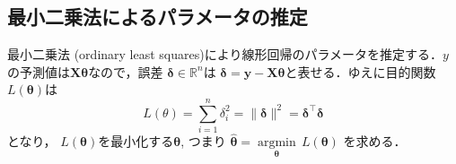 \subsection{最小二乗法によるパラメータの推定}最小二乗法 (ordinary least squares)により線形回帰のパラメータを推定する．$y$の予測値は$\mathbf{X} \mathbf{\theta}$なので，誤差 $\mathbf{\delta} \in \mathbb{R}^n$は
$\mathbf{\delta} = \mathbf{y}-\mathbf{X} \mathbf{\theta}$と表せる．ゆえに目的関数$L(\mathbf{\theta})$は 
$$
L(\theta)=\sum_{i=1}^n \delta_i^2 = \|\mathbf{\delta}\|^2=\mathbf{\delta}^\top \mathbf{\delta}
$$
となり， $L(\mathbf{\theta})$を最小化する$\mathbf{\theta}$, つまり $\hat {\mathbf {\theta }}={\underset {\mathbf {\theta}}{\operatorname {arg min} }}\,L({\mathbf{\theta}})$
を求める．